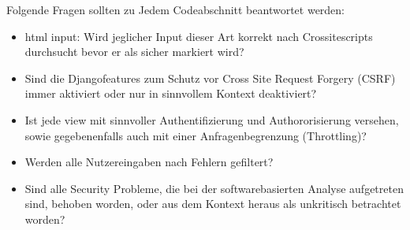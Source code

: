\documentclass[accentcolor=tud0b,12pt,paper=a4]{tudreport}
\begin{document}
Folgende Fragen sollten zu Jedem Codeabschnitt beantwortet werden:

\begin{itemize}
    \item html input: Wird jeglicher Input dieser Art korrekt nach Crossitescripts durchsucht bevor er als sicher markiert wird?
    \item Sind die Djangofeatures zum Schutz vor Cross Site Request Forgery (CSRF) immer aktiviert oder nur in sinnvollem Kontext deaktiviert?
    \item Ist jede view mit sinnvoller Authentifizierung und Authororisierung versehen, sowie gegebenenfalls auch mit einer Anfragenbegrenzung (Throttling)?
    \item Werden alle Nutzereingaben nach Fehlern gefiltert?
    \item Sind alle Security Probleme, die bei der softwarebasierten Analyse aufgetreten sind, behoben worden, oder aus dem Kontext heraus als unkritisch betrachtet worden?
\end{itemize}
\end{document}
